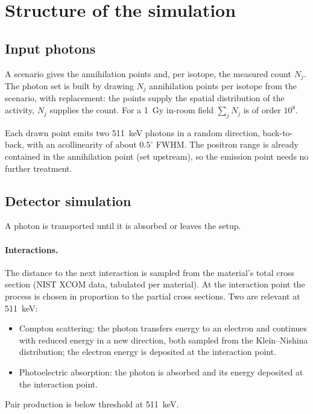 \documentclass[11pt]{article}
\begin{document}
\section{Structure of the simulation}
\label{sec:structure}

\subsection{Input photons}
\label{sec:input}

A scenario gives the annihilation points and, per isotope, the measured count $N_j$. The
photon set is built by drawing $N_j$ annihilation points per isotope from the scenario,
with replacement: the points supply the spatial distribution of the activity, $N_j$
supplies the count. For a \SI{1}{Gy} in-room field $\sum_j N_j$ is of order $10^{8}$.

Each drawn point emits two \SI{511}{keV} photons in a random direction, back-to-back, with
an acollinearity of about $0.5^\circ$ FWHM. The positron range is already contained in the
annihilation point (set upstream), so the emission point needs no further treatment.

\subsection{Detector simulation}
\label{sec:detsim}

A photon is transported until it is absorbed or leaves the setup.

\paragraph{Interactions.}
The distance to the next interaction is sampled from the material's total cross section
(NIST XCOM data, tabulated per material). At the interaction point the process is chosen
in proportion to the partial cross sections. Two are relevant at \SI{511}{keV}:
\begin{itemize}[nosep]
\item Compton scattering: the photon transfers energy to an electron and continues with
reduced energy in a new direction, both sampled from the Klein--Nishina distribution; the
electron energy is deposited at the interaction point.
\item Photoelectric absorption: the photon is absorbed and its energy deposited at the
interaction point.
\end{itemize}
Pair production is below threshold at \SI{511}{keV}.
\end{document}

